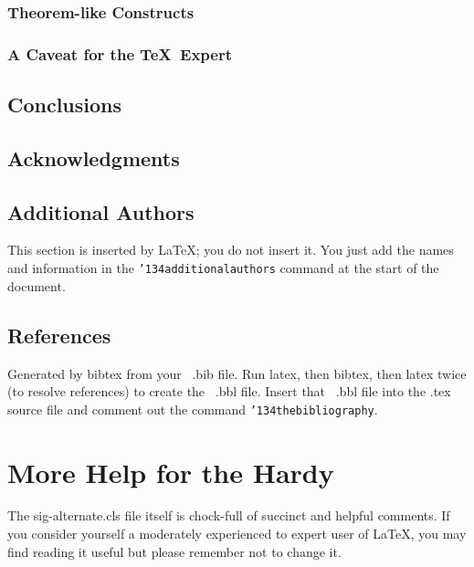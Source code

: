 \documentclass{style/nime-alternate}
\begin{document}
\subsubsection{Theorem-like Constructs}
\subsubsection*{A Caveat for the \TeX\ Expert}
\subsection{Conclusions}
\subsection{Acknowledgments}
\subsection{Additional Authors}
This section is inserted by \LaTeX; you do not insert it.
You just add the names and information in the
\texttt{{\char'134}additionalauthors} command at the start
of the document.
\subsection{References}
Generated by bibtex from your ~.bib file.  Run latex,
then bibtex, then latex twice (to resolve references)
to create the ~.bbl file.  Insert that ~.bbl file into
the .tex source file and comment out
the command \texttt{{\char'134}thebibliography}.

\section{More Help for the Hardy}
The sig-alternate.cls file itself is chock-full of succinct
and helpful comments.  If you consider yourself a moderately
experienced to expert user of \LaTeX, you may find reading
it useful but please remember not to change it.


\end{document}
